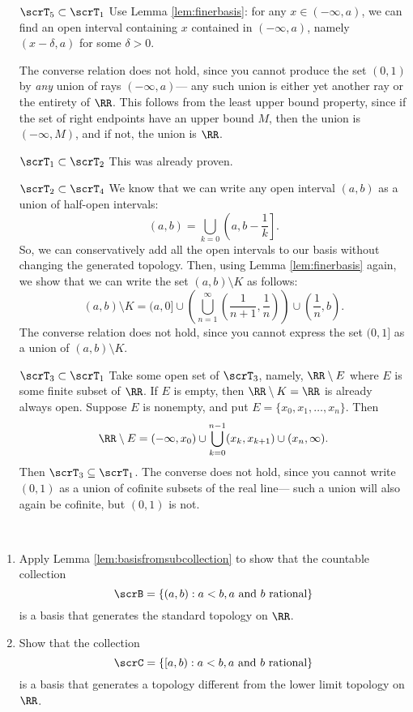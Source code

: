 \documentclass{article}
\begin{document}
\begin{itemize}
    \item[$\scrT_5 \subset \scrT_1$]
        Use Lemma \ref{lem:finerbasis}: for any $x \in (-\infty, a)$, we can find an open interval containing $x$ contained in $(-\infty, a)$, namely $(x-\delta, a)$ for some $\delta > 0$.

        The converse relation does not hold, since you cannot produce the set $(0,1)$ by \textit{any} union of rays $(-\infty, a)$--- any such union is either yet another ray or the entirety of $\RR$.
        This follows from the least upper bound property, since if the set of right endpoints have an upper bound $M$, then the union is $(-\infty, M)$, and if not, the union is $\RR$.
    \item[$\scrT_1 \subset \scrT_2$] This was already proven.
    \item[$\scrT_2 \subset \scrT_4$]
        We know that we can write any open interval $(a,b)$ as a union of half-open intervals: 
        \[
            (a,b) = \bigcup_{k=0}\left(a,b-\frac{1}{k}\right].
        \]
        So, we can conservatively add all the open intervals to our basis without changing the generated topology.
        Then, using Lemma \ref{lem:finerbasis} again, we show that we can write the set $(a,b) \setminus K$ as follows:
        \[
            (a,b) \setminus K = (a, 0] \cup \left(\bigcup_{n=1}^\infty \left(\frac{1}{n+1},\frac{1}{n}\right)\right) \cup \left(\frac{1}{n}, b\right).
        \]
        The converse relation does not hold, since you cannot express the set $(0,1]$ as a union of $(a,b) \setminus K$.
    \item[$\scrT_3 \subset \scrT_1$]
        Take some open set of $\scrT_3$, namely, $\RR \setminus E$ where $E$ is some finite subset of $\RR$.
        If $E$ is empty, then $\RR \setminus K = \RR$ is already always open.
        Suppose $E$ is nonempty, and put $E = \{x_0, x_1, \ldots, x_n\}$.
        Then
        \[
            \RR \setminus E = (-\infty, x_0) \cup \bigcup_{k=0}^{n-1}(x_k, x_{k+1}) \cup (x_n, \infty).
        \]
        Then $\scrT_3 \subseteq \scrT_1$.
        The converse does not hold, since you cannot write $(0, 1)$ as a union of cofinite subsets of the real line--- such a union will also again be cofinite, but $(0,1)$ is not.
\end{itemize}

\begin{exercise}\
    \begin{enumerate}[label=(\alph*)]
        \item 
            Apply Lemma \ref{lem:basisfromsubcollection} to show that the countable collection
            \[
                \scrB = \{(a,b): a<b,a\text{ and }b\text{ rational}\}
            \]
            is a basis that generates the standard topology on $\RR$.
        \item 
            Show that the collection
            \[
                \scrC = \{[a,b): a<b,a\text{ and }b\text{ rational}\}
            \]
            is a basis that generates a topology different from the lower limit topology on $\RR$.
    \end{enumerate}
\end{exercise}
\end{document}
